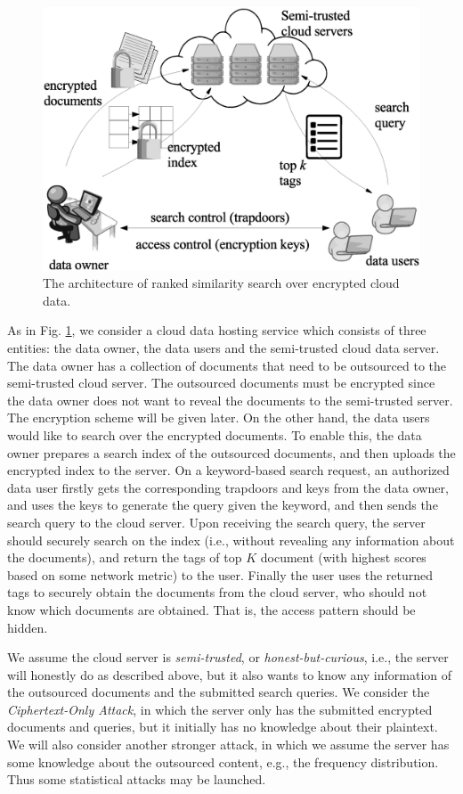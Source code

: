 \documentclass{IEEEtran}
\begin{document}
\begin{figure}
\centering
\includegraphics[width=0.8\linewidth]{system_model.eps}
\caption{The architecture of ranked similarity search over encrypted cloud data.}
\label{fig:system_model}
\end{figure}

As in Fig. \ref{fig:system_model}, we consider a cloud data hosting service which consists of three entities: the data owner, the data users and the semi-trusted cloud data server. The data owner has a collection of documents that need to be outsourced to the semi-trusted cloud server. The outsourced documents must be encrypted since the data owner does not want to reveal the documents to the semi-trusted server. The encryption scheme will be given later. On the other hand, the data users would like to search over the encrypted documents. To enable this, the data owner prepares a search index of the outsourced documents, and then uploads the encrypted index to the server. On a keyword-based search request, an authorized data user firstly gets the corresponding trapdoors and keys from the data owner, and uses the keys to generate the query given the keyword, and then sends the search query to the cloud server. Upon receiving the search query, the server should securely search on the index (i.e., without revealing any information about the documents), and return the tags of top $K$ document (with highest scores based on some network metric) to the user. Finally the user uses the returned tags to securely obtain the documents from the cloud server, who should not know which documents are obtained. That is, the access pattern should be hidden.

We assume the cloud server is \emph{semi-trusted}, or \emph{honest-but-curious}, i.e., the server will honestly do as described above, but it also wants to know any information of the outsourced documents and the submitted search queries. We consider the \emph{Ciphertext-Only Attack}, in which the server only has the submitted encrypted documents and queries, but it initially has no knowledge about their plaintext. We will also consider another stronger attack, in which we assume the server has some knowledge about the outsourced content, e.g., the frequency distribution. Thus some statistical attacks may be launched.
\end{document}

